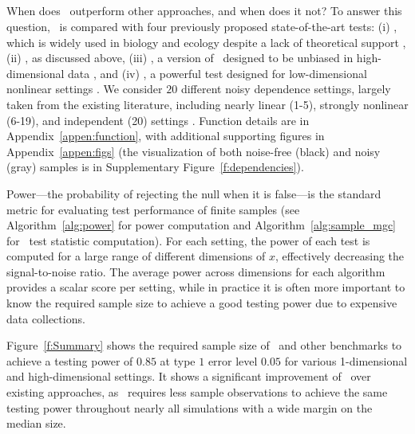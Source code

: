 \documentclass[11pt]{article}
\begin{document}
\subsection*{}

When does \Mgc~outperform other approaches, and when does it not?
To answer this question, \Mgc~is compared with four previously proposed state-of-the-art tests: (i) \Mantel, which is widely used in biology and ecology despite a lack of theoretical support \cite{Mantel1967}, (ii) \Dcorr, as discussed above, (iii) \Mcorr, a version of \Dcorr~designed to be unbiased in high-dimensional data \cite{SzekelyRizzo2013a}, and (iv) \Hhg, a powerful test designed for low-dimensional nonlinear settings \cite{HellerGorfine2013}. 
We consider $20$ different noisy dependence settings, largely taken from the existing literature, including  nearly linear (1-5), strongly nonlinear (6-19), and independent (20) settings \cite{SzekelyRizzoBakirov2007, SimonTibshirani2012, GorfineHellerHeller2012, HellerGorfine2013, SzekelyRizzo2013a}.  
Function details are in Appendix~\ref{appen:function}, with additional supporting figures in Appendix~\ref{appen:figs} (the visualization of both noise-free (black) and noisy (gray) samples is in Supplementary Figure~\ref{f:dependencies}).  


Power---the probability of rejecting the null when it is  false---is the standard metric for evaluating test performance of finite samples (see Algorithm~\ref{alg:power} for power computation and Algorithm~\ref{alg:sample_mgc} for \Mgc~test statistic computation).  
For each setting, the power of each test is computed for a large range of different dimensions of $x$,  effectively decreasing the signal-to-noise ratio.  
The average power across dimensions for each algorithm provides a scalar score per setting, while in practice it is often more important to know the required sample size to achieve a good testing power due to expensive data collections. 

Figure~\ref{f:Summary} shows the required sample size of \Mgc~and other benchmarks to achieve a testing power of $0.85$ at type $1$ error level $0.05$ for various 1-dimensional and high-dimensional settings. It shows a significant improvement of \Mgc~over existing approaches, as \Mgc~requires less sample observations to achieve the same testing power throughout nearly all simulations with a wide margin on the median size.
  
\end{document}
